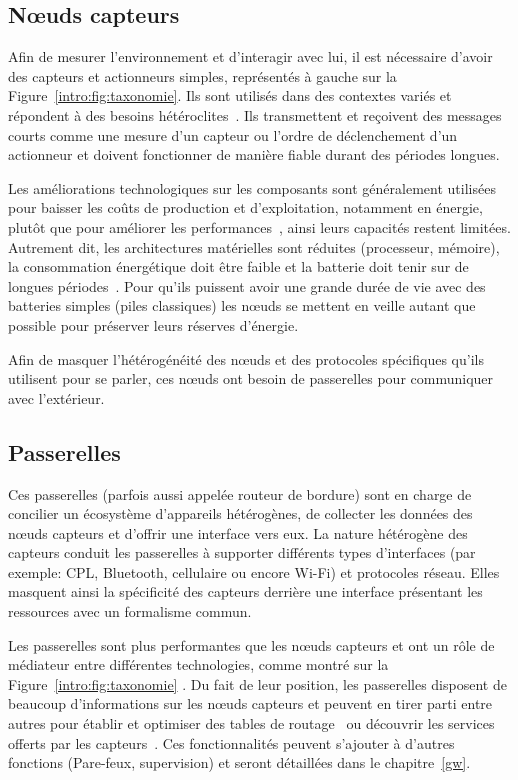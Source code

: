 \subsection{Nœuds capteurs}

Afin de mesurer l'environnement et d'interagir avec lui, il est nécessaire d'avoir des capteurs et actionneurs simples, représentés à gauche sur la Figure~\ref{intro:fig:taxonomie}.
Ils sont utilisés dans des contextes variés et répondent à des besoins hétéroclites~\cite{werner2006deploying}.
Ils transmettent et reçoivent des messages courts comme une mesure d'un capteur ou l'ordre de déclenchement d'un actionneur et doivent fonctionner de manière fiable durant des périodes longues.

Les améliorations technologiques sur les composants sont généralement utilisées pour baisser les coûts de production et d'exploitation, notamment en énergie, plutôt que pour améliorer les performances~\cite{murugesan2008harnessing}, ainsi leurs capacités restent limitées.
Autrement dit, les architectures matérielles sont réduites (processeur, mémoire), la consommation énergétique doit être faible et la batterie doit tenir sur de longues périodes~\cite{werner2006deploying}.
Pour qu'ils puissent avoir une grande durée de vie avec des batteries simples (piles classiques) les nœuds se mettent en veille autant que possible pour préserver leurs réserves d'énergie.

Afin de masquer l'hétérogénéité des nœuds et des protocoles spécifiques qu'ils utilisent pour se parler, ces nœuds ont besoin de passerelles pour communiquer avec l'extérieur.

\subsection{Passerelles}

Ces passerelles (parfois aussi appelée routeur de bordure) sont en charge de concilier un écosystème d'appareils hétérogènes, de collecter les données des nœuds capteurs et d'offrir une interface vers eux.
La nature hétérogène des capteurs conduit les passerelles à supporter différents types d'interfaces (par exemple: \ac{CPL}, Bluetooth, cellulaire ou encore Wi-Fi) et protocoles réseau.
Elles masquent ainsi la spécificité des capteurs derrière une interface présentant les ressources avec un formalisme commun.

Les passerelles sont plus performantes que les nœuds capteurs et ont un rôle de médiateur entre différentes technologies, comme montré sur la Figure~\ref{intro:fig:taxonomie} .
Du fait de leur position, les passerelles disposent de beaucoup d'informations sur les nœuds capteurs et peuvent en tirer parti entre autres pour établir et optimiser des tables de routage~\cite{rfc6550} ou découvrir les services offerts par les capteurs~\cite{cirani2014scalable}.
Ces fonctionnalités peuvent s'ajouter à d'autres fonctions (Pare-feux, supervision) et seront détaillées dans le chapitre~\ref{gw}.

